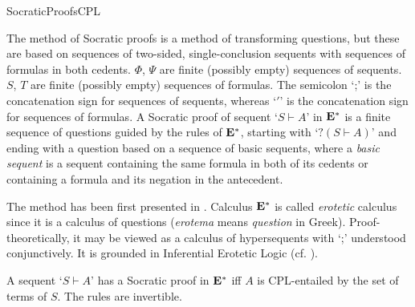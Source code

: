 \begin{entry}{SocraticProofsCPL}
\begin{calculus}
\end{calculus}

\begin{clarifications}
The method of Socratic proofs is a method of transforming questions, but these are based on sequences of two-sided, single-conclusion sequents with sequences of formulas in both cedents. $\Phi$, $\Psi$ are finite (possibly empty) sequences of sequents. $S$, $T$ are finite (possibly empty) sequences of formulas. The semicolon `;' is the concatenation sign for sequences of sequents, whereas `$'$' is the concatenation sign for sequences of formulas. A Socratic proof of sequent `$S \vdash A$' in $\mathbf{E}^*$ is a finite sequence of questions guided by the rules of $\mathbf{E}^*$, starting with `$? (S \vdash A)$' and ending with a question based on a sequence of basic sequents, where a \textit{basic sequent} is a sequent containing the same formula in both of its cedents or containing a formula and its negation in the antecedent.
\end{clarifications}

\begin{history}
The method has been first presented in \cite{AW:2004}. Calculus $\mathbf{E}^*$ is called \textit{erotetic} calculus since it is a calculus of questions (\textit{erotema} means \textit{question} in Greek). Proof-theoretically, it may be viewed as a calculus of hypersequents with `;' understood conjunctively. It is grounded in Inferential Erotetic Logic (cf. \cite{AW:2013}).
\end{history}

\begin{technicalities}
A sequent `$S \vdash A$' has a Socratic proof in $\mathbf{E}^*$ iff $A$ is CPL-entailed by the set of terms of $S$. The rules are invertible.
\end{technicalities}


%
%
%
%
%
%
% 
%




\end{entry}
